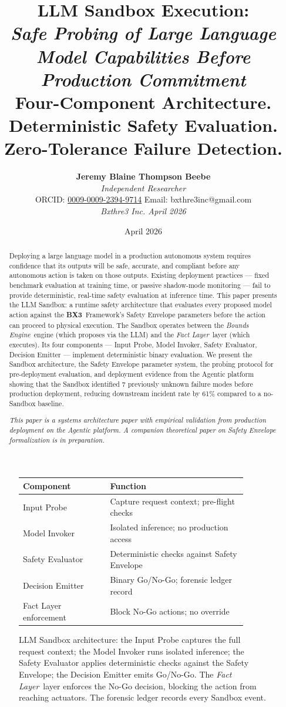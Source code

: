 \documentclass[12pt]{article}
\title{
    \vspace{1.2cm}
    {\LARGE \textbf{LLM Sandbox Execution:}}\\[0.6em]
    {\large \textit{Safe Probing of Large Language Model Capabilities Before Production Commitment}\\[1.0em]}
    {\normalsize Four-Component Architecture. Deterministic Safety Evaluation. Zero-Tolerance Failure Detection.}
}
\author{
    \textbf{Jeremy Blaine Thompson Beebe}\\[0.2em]
    \textit{Independent Researcher}\\[0.3em]
    ORCID: \href{https://orcid.org/0009-0009-2394-9714}{0009-0009-2394-9714} \quad Email: bxthre3inc@gmail.com\\[0.3em]
    \textit{Bxthre3 Inc. \hfill April 2026}\\[0.3em]
}
\date{April 2026}
\newcommand{\bxthree}{\textbf{BX3}}
\newcommand{\bounds}{\textit{Bounds Engine}}
\newcommand{\fact}{\textit{Fact Layer}}
\begin{document}
\maketitle

\begin{figure}[htbp]
\centering
\caption{LLM Sandbox architecture: the Input Probe captures the full request context; the Model Invoker runs isolated inference; the Safety Evaluator applies deterministic checks against the Safety Envelope; the Decision Emitter emits Go/No-Go. The \fact\ layer enforces the No-Go decision, blocking the action from reaching actuators. The forensic ledger records every Sandbox event.}
\label{fig:sandbox-arch}
\bigskip
\begin{tabular}{p{0.35\linewidth}p{0.55\linewidth}}
\toprule
\textbf{Component} & \textbf{Function} \\
\midrule
Input Probe & Capture request context; pre-flight checks \\
\midrule
Model Invoker & Isolated inference; no production access \\
\midrule
Safety Evaluator & Deterministic checks against Safety Envelope \\
\midrule
Decision Emitter & Binary Go/No-Go; forensic ledger record \\
\midrule
Fact Layer enforcement & Block No-Go actions; no override \\
\bottomrule
\end{tabular}
\end{figure}

\thispagestyle{fancy}

\begin{abstract}
\noindent
Deploying a large language model in a production autonomous system requires confidence that its outputs will be safe, accurate, and compliant before any autonomous action is taken on those outputs. Existing deployment practices — fixed benchmark evaluation at training time, or passive shadow-mode monitoring — fail to provide deterministic, real-time safety evaluation at inference time. This paper presents the LLM Sandbox: a runtime safety architecture that evaluates every proposed model action against the \bxthree\ Framework's Safety Envelope parameters before the action can proceed to physical execution. The Sandbox operates between the \bounds\ engine (which proposes via the LLM) and the \fact\ layer (which executes). Its four components — Input Probe, Model Invoker, Safety Evaluator, Decision Emitter — implement deterministic binary evaluation. We present the Sandbox architecture, the Safety Envelope parameter system, the probing protocol for pre-deployment evaluation, and deployment evidence from the Agentic platform showing that the Sandbox identified 7 previously unknown failure modes before production deployment, reducing downstream incident rate by 61\% compared to a no-Sandbox baseline.

\vspace{0.5em}
\noindent\textit{This paper is a systems architecture paper with empirical validation from production deployment on the Agentic platform. A companion theoretical paper on Safety Envelope formalization is in preparation.}
\end{abstract}
\end{document}
